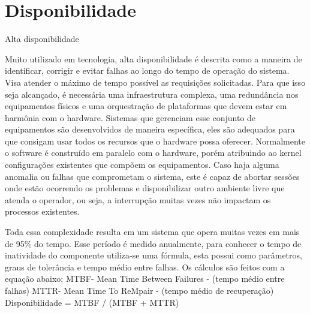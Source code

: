 \chapter{Disponibilidade}

Alta disponibilidade

Muito utilizado em tecnologia, alta disponibilidade é descrita como a maneira de identificar, corrigir e evitar falhas ao longo do tempo de operação do sistema. Visa atender o máximo de tempo possível as requisições solicitadas. Para que isso seja alcançado, é necessária uma infraestrutura complexa, uma redundância nos equipamentos físicos e uma orquestração de plataformas que devem estar em harmônia com o hardware. Sistemas que gerenciam esse conjunto de equipamentos são desenvolvidos de maneira específica, eles são adequados para que consigam usar todos os recursos que o hardware possa oferecer. Normalmente o software é construído em paralelo com o hardware, porém atribuindo ao kernel configurações existentes que compõem os equipamentos. 
Caso haja alguma anomalia ou falhas que comprometam o sistema, este é capaz de abortar sessões onde estão ocorrendo os problemas e disponibilizar outro ambiente livre que atenda o operador, ou seja, a interrupção muitas vezes não impactam os processos existentes.


Toda essa complexidade resulta em um sistema que opera muitas vezes em mais de 95\% do tempo. Esse período é medido anualmente, para conhecer o tempo de inatividade do componente utiliza-se uma fórmula, esta possui como parâmetros, graus de tolerância e tempo médio entre falhas. Os cálculos são feitos com a equação abaixo;
MTBF- Mean Time Between Failures - (tempo médio entre falhas)
MTTR- Mean Time To ReMpair - (tempo médio de recuperação)
Disponibilidade = MTBF / (MTBF + MTTR)


